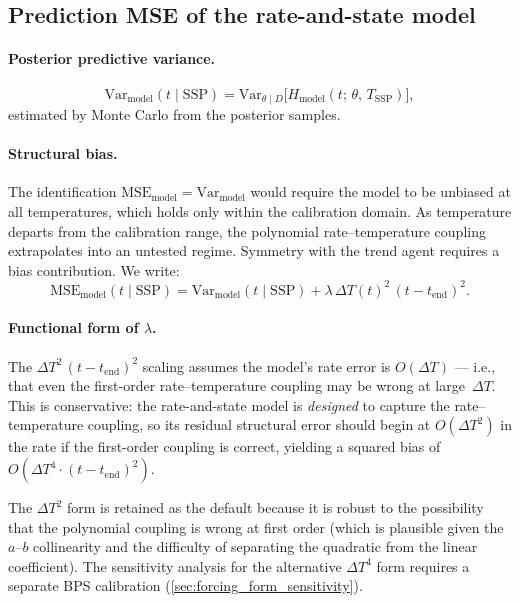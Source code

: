 \documentclass[11pt]{article}
\newcommand{\dT}{\Delta T}
\newcommand{\tend}{t_{\mathrm{end}}}
\newcommand{\MSEmodel}{\mathrm{MSE}_{\mathrm{model}}}
\begin{document}
\subsection{Prediction MSE of the rate-and-state model}
\label{sec:model_MSE}

\paragraph{Posterior predictive variance.}
\begin{equation}
  \mathrm{Var}_{\mathrm{model}}(t \mid \mathrm{SSP}) = \mathrm{Var}_{\theta \mid D}\big[H_{\mathrm{model}}(t;\,\theta,\,T_{\mathrm{SSP}})\big],
  \label{eq:var_model}
\end{equation}
estimated by Monte Carlo from the posterior samples.

\paragraph{Structural bias.}  The identification $\MSEmodel = \mathrm{Var}_{\mathrm{model}}$ would require the model to be unbiased at all temperatures, which holds only within the calibration domain.  As temperature departs from the calibration range, the polynomial rate--temperature coupling extrapolates into an untested regime.  Symmetry with the trend agent requires a bias contribution.  We write:
\begin{equation}
  \MSEmodel(t \mid \mathrm{SSP}) = \mathrm{Var}_{\mathrm{model}}(t \mid \mathrm{SSP}) + \lambda\,\dT(t)^2\,(t - \tend)^2.
  \label{eq:MSE_model}
\end{equation}

\paragraph{Functional form of $\lambda$.}  The $\dT^2\,(t - \tend)^2$ scaling assumes the model's rate error is $O(\dT)$ --- i.e., that even the first-order rate--temperature coupling may be wrong at large~$\dT$.  This is conservative: the rate-and-state model is \emph{designed} to capture the rate--temperature coupling, so its residual structural error should begin at $O(\dT^2)$ in the rate if the first-order coupling is correct, yielding a squared bias of $O(\dT^4 \cdot (t - \tend)^2)$.

The $\dT^2$ form is retained as the default because it is robust to the possibility that the polynomial coupling is wrong at first order (which is plausible given the $a$--$b$ collinearity and the difficulty of separating the quadratic from the linear coefficient).  The sensitivity analysis for the alternative $\dT^4$ form requires a separate BPS calibration (\cref{sec:forcing_form_sensitivity}).
\end{document}
